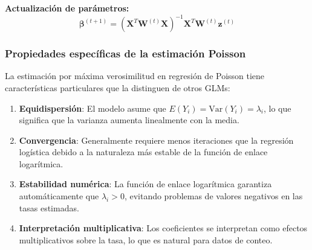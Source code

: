 \documentclass[
  letterpaper,
  DIV=11,
  numbers=noendperiod]{scrreprt}
\begin{document}
\textbf{Actualización de parámetros:}
\[\boldsymbol{\beta}^{(t+1)} = (\mathbf{X}^T \mathbf{W}^{(t)} \mathbf{X})^{-1} \mathbf{X}^T \mathbf{W}^{(t)} \mathbf{z}^{(t)}\]

\subsubsection{Propiedades específicas de la estimación
Poisson}\label{propiedades-especuxedficas-de-la-estimaciuxf3n-poisson}

La estimación por máxima verosimilitud en regresión de Poisson tiene
características particulares que la distinguen de otros GLMs:

\begin{enumerate}
\def\labelenumi{\arabic{enumi}.}
\item
  \textbf{Equidispersión}: El modelo asume que
  \(E(Y_i) = \text{Var}(Y_i) = \lambda_i\), lo que significa que la
  varianza aumenta linealmente con la media.
\item
  \textbf{Convergencia}: Generalmente requiere menos iteraciones que la
  regresión logística debido a la naturaleza más estable de la función
  de enlace logarítmica.
\item
  \textbf{Estabilidad numérica}: La función de enlace logarítmica
  garantiza automáticamente que \(\lambda_i > 0\), evitando problemas de
  valores negativos en las tasas estimadas.
\item
  \textbf{Interpretación multiplicativa}: Los coeficientes se
  interpretan como efectos multiplicativos sobre la tasa, lo que es
  natural para datos de conteo.
\end{enumerate}
\end{document}
